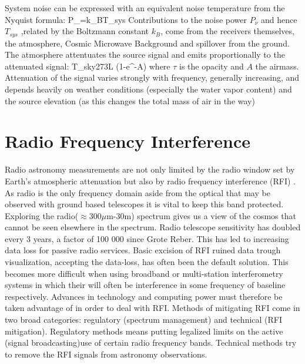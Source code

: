 System noise can be expressed with an equivalent noise temperature from the Nyquist formula:
\be
P_\nu=k_BT_{sys}
\ee
Contributions to the noise power $P_\nu$ and hence $T_{sys}$ ,related by the Boltzmann constant $k_B$, come from the receivers themselves, the atmosphere, Cosmic Microwave Background and spillover from the ground.
The atmosphere attentuates the source signal and emits proportionally to the attenuated signal:
\be
T_{sky}\approx 273L (1-e^{-\tau A})
\ee
where $\tau$ is the opacity and $A$ the airmass.
Attenuation of the signal varies strongly with frequency, generally increasing, and depends heavily on weather conditions (especially the water vapor content) and the source elevation (as this changes the total mass of air in the way)















\section{Radio Frequency Interference}

Radio astronomy measurements are not only limited by the radio window set by Earth's atmospheric attenuation but also by radio frequency interference (RFI) \citep{offringa2010post}.
As radio is the only frequency domain aside from the optical that may be observed with ground based telescopes it is vital to keep this band protected.
Exploring the radio($\approx 300\mu$m-$30$m) spectrum gives us a view of the cosmos that cannot be seen elsewhere in the spectrum.\citep{van2009radio}
Radio telescope sensitivity has doubled every 3 years, a factor of 100 000 since Grote Reber\citep{van2009radio}.
This has led to increasing data loss for passive radio services\citep{fridman2001rfi}.
Basic excision of RFI ruined data trough visualization, accepting the data-loss, has often been the default solution\citep{fridman2001rfi}.
This becomes more difficult when using broadband or multi-station interferometry systems in which their will often be interference in some frequency of baseline respectively.
Advances in technology and computing power must therefore be taken advantage of in order to deal with RFI.
Methods of mitigating RFI come in two broad categories: regulatory (spectrum management) and technical (RFI mitigation)\citep{van2009radio}. 
Regulatory methods means putting legalized limits on the active (signal broadcasting)use of certain radio frequency bands.
Technical methods try to remove the RFI signals from astronomy observations.\citep{van2009radio}

